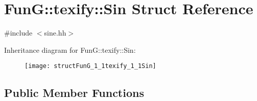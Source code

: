 \hypertarget{structFunG_1_1texify_1_1Sin}{\section{Fun\-G\-:\-:texify\-:\-:Sin Struct Reference}
\label{structFunG_1_1texify_1_1Sin}
}


{\ttfamily \#include $<$sine.\-hh$>$}

Inheritance diagram for Fun\-G\-:\-:texify\-:\-:Sin\-:\begin{figure}[H]
\begin{center}
\leavevmode
\texttt{[image: structFunG\_1\_1texify\_1\_1Sin]}
\end{center}
\end{figure}
\subsection*{Public Member Functions}
